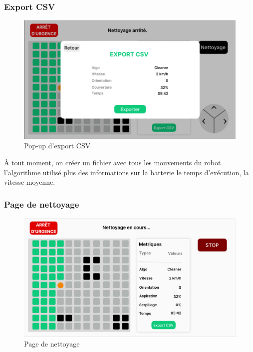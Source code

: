 \subsubsection{Export CSV}

\begin{figure}[H]
    \centering
    \includegraphics[scale=0.25]{data/IHM4.png}
    \caption{Pop-up d'export CSV}
    \label{fig:ihm_android_export}
\end{figure}

À tout moment, on créer un fichier avec tous les mouvements du robot l'algorithme utilisé plus des informations sur la batterie le temps d'exécution, la vitesse moyenne.

\subsubsection{Page de nettoyage}

\begin{figure}[H]
    \centering
    \includegraphics[scale=0.25]{data/IHM5.png}
    \caption{Page de nettoyage}
    \label{fig:ihm_android_cleaning}
\end{figure}

